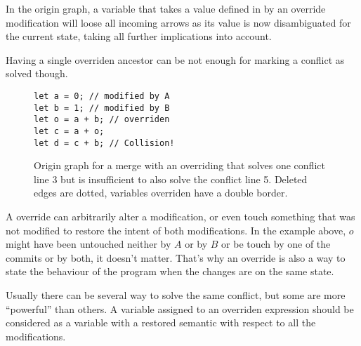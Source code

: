 \documentclass[a4paper,10pt]{article}
\begin{document}
In the origin graph, a variable that takes a value defined in by an override modification will loose all incoming arrows as its value is now disambiguated for the current state, taking all further implications into account.

Having a single overriden ancestor can be not enough for marking a conflict as solved though.

\begin{figure}[ht]
\begin{minipage}{.5\textwidth}
\begin{lstlisting}
let a = 0; // modified by A
let b = 1; // modified by B
let o = a + b; // overriden
let c = a + o;
let d = c + b; // Collision!
\end{lstlisting}
\end{minipage}\hfill
\begin{minipage}{.45\textwidth}
\centering{}
\end{minipage}
\caption{Origin graph for a merge with an overriding that solves one conflict line 3 but is insufficient to also solve the conflict line 5. Deleted edges are dotted, variables overriden have a double border.}
\end{figure}

A override can arbitrarily alter a modification, or even touch something that was not modified to restore the intent of both modifications. In the example above, $o$ might have been untouched neither by $A$ or by $B$ or be touch by one of the commits or by both, it doesn't matter. That's why an override is also a way to state the behaviour of the program when the changes are on the same state.

Usually there can be several way to solve the same conflict, but some are more ``powerful'' than others. A variable assigned to an overriden expression should be considered as a variable with a restored semantic with respect to all the modifications.
\end{document}
